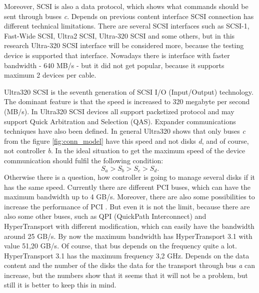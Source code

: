 Moreover, SCSI is also a data protocol, which shows what commands should be sent through buses \emph{c}. Depends on previous content interface SCSI connection has different technical limitations. There are several SCSI interfaces such as SCSI-1, Fast-Wide SCSI, Ultra2 SCSI, Ultra-320 SCSI and some others, but in this research Ultra-320 SCSI interface will be considered more, because the testing device is supported that interface. Nowadays there is interface with faster bandwidth - 640 MB/s - but it did not get popular, because it supports maximum 2 devices per cable.

Ultra320 SCSI \cite{ultra320} is the seventh generation of SCSI I/O (Input/Output) technology. The dominant feature is that the speed is increased to 320 megabyte per second (MB/s). In Ultra320 SCSI devices all support packetized protocol and may support Quick Arbitration and Selection (QAS). Expander communications techniques have also been defined. In general Ultra320 shows that only buses \emph{c} from the figure \ref{fig:conn_model} have this speed and not disks \emph{d}, and of course, not controller \emph{b}. In the ideal situation to get the maximum speed of the device communication should fulfil the following condition:
\begin{equation}
	S_a > S_b > S_c > S_d.
\end{equation}
Otherwise there is a question, how controller is going to manage several disks if it has the same speed.
Currently there are different PCI buses, which can have the maximum bandwidth up to 4 GB/s. Moreover, there are also some possibilities to increase the performance of PCI \cite{increase_pci}. But even it is not the limit, because there are also some other buses, such as QPI (QuickPath Interconnect) and HyperTransport with different modification, which can easily have the bandwidth around 25 GB/s. By now the maximum bandwidth has HyperTransport 3.1 with value 51,20 GB/s. Of course, that bus depends on the frequency quite a lot. HyperTransport 3.1 has the maximum frequency 3,2 GHz. Depends on the data content and the number of the disks the data for the transport through bus \emph{a} can increase, but the numbers show that it seems that it will not be a problem, but still it is better to keep this in mind.



